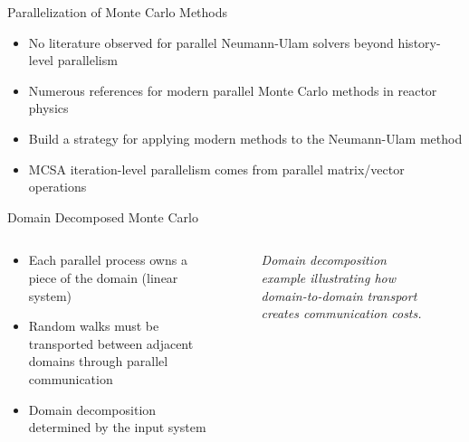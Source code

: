 \documentclass{beamer}
\begin{document}
\begin{frame}{Parallelization of Monte Carlo Methods}

  \begin{itemize}
  \item No literature observed for parallel Neumann-Ulam solvers
    beyond history-level parallelism
    \medskip \medskip
  \item Numerous references for modern parallel Monte Carlo methods in
    reactor physics
    \medskip \medskip
  \item Build a strategy for applying modern methods to the
    Neumann-Ulam method
    \medskip \medskip
  \item MCSA iteration-level parallelism comes from parallel
    matrix/vector operations
  \end{itemize}

\end{frame}

\begin{frame}{Domain Decomposed Monte Carlo}

  \begin{columns}
    \begin{column}{0.5\textwidth}
      \begin{itemize}
      \item Each parallel process owns a piece of the domain (linear
        system)
        \bigskip
      \item Random walks must be transported between adjacent domains
        through parallel communication
        \bigskip
      \item Domain decomposition determined by the input system
      \end{itemize}
    \end{column}

    \begin{column}{0.5\textwidth}
      \begin{figure}[htpb!]
        \begin{center}
          \scalebox{0.75}{  }
        \end{center}
        \caption{\small \sl Domain decomposition example illustrating
          how domain-to-domain transport creates communication costs.}
      \end{figure}
    \end{column}
  \end{columns}

\end{frame}
\end{document}
